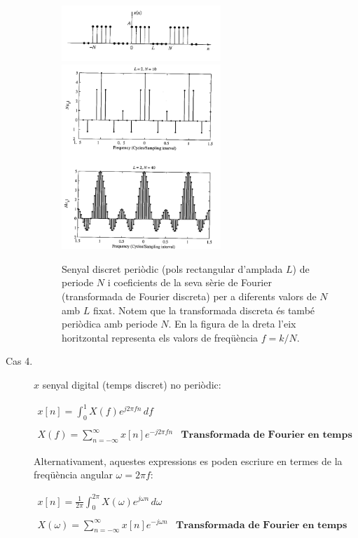 \documentclass{article}
\begin{document}
\begin{description}
\begin{figure}[htbp]
\begin{center}
\includegraphics[width=6cm]{polsrectperdiscret.png} 
$\qquad$
\includegraphics[width=6cm]{sincdiscret.png} 
\end{center}
\caption{Senyal discret peri\`odic (pols rectangular d'amplada $L$) de periode $N$ i coeficients de la
seva s\`erie de Fourier (transformada de Fourier discreta) per a diferents valors de $N$ amb $L$ fixat.
Notem que la transformada discreta \'es tamb\'e peri\`odica amb periode $N$. En la figura de la dreta
l'eix horitzontal representa els valors de freq\"u\`encia $f=k/N$.}
\end{figure}


\item[Cas 4.] $x$ senyal digital (temps discret) no peri\`odic:

\[
\begin{array}{ll}
x[n]=\displaystyle \int_0^1 X(f) e^{j 2 \pi f n} \, df & \\ \\
X(f)=\displaystyle \sum_{n=-\infty}^\infty x[n] e^{-j 2 \pi f n} & \textbf{Transformada de Fourier en temps discret}
\end{array}
\]

\noindent
Alternativament, aquestes expressions es poden escriure en termes de la freq\"u\`encia angular $\omega=2\pi f$:

\[
\begin{array}{ll}
x[n]=\displaystyle \frac{1}{2\pi} \int_0^{2\pi} X(\omega) e^{j \omega n} \, d\omega & \\ \\
X(\omega)=\displaystyle \sum_{n=-\infty}^\infty x[n] e^{-j \omega n} & \textbf{Transformada de Fourier en temps discret}
\end{array}
\]


\end{description}
\end{document}
